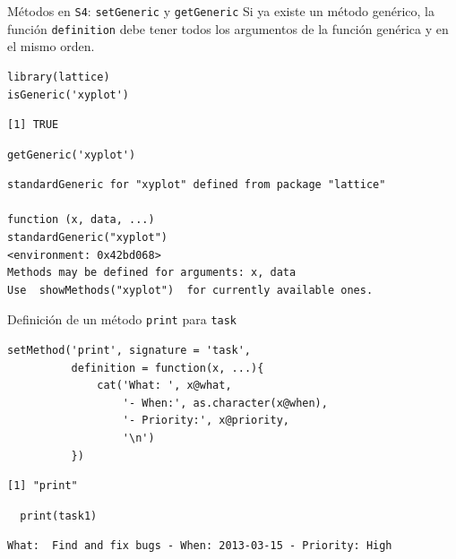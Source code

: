 \documentclass[xcolor={usenames,svgnames,dvipsnames}]{beamer}
\begin{document}
\begin{frame}[fragile,label={sec:orgheadline33}]{Métodos en \texttt{S4}: \texttt{setGeneric} y \texttt{getGeneric}}
 Si ya existe un método genérico, la función \texttt{definition} debe tener
todos los argumentos de la función genérica y en el mismo orden.

\lstset{language=R,label= ,caption= ,captionpos=b,numbers=none}
\begin{lstlisting}
library(lattice)  
isGeneric('xyplot')
\end{lstlisting}

\begin{verbatim}
[1] TRUE
\end{verbatim}

\lstset{language=R,label= ,caption= ,captionpos=b,numbers=none}
\begin{lstlisting}
getGeneric('xyplot')
\end{lstlisting}

\begin{verbatim}
standardGeneric for "xyplot" defined from package "lattice"

function (x, data, ...) 
standardGeneric("xyplot")
<environment: 0x42bd068>
Methods may be defined for arguments: x, data
Use  showMethods("xyplot")  for currently available ones.
\end{verbatim}
\end{frame}

\begin{frame}[fragile,label={sec:orgheadline34}]{Definición de un método \texttt{print} para \texttt{task}}
 \lstset{language=R,label= ,caption= ,captionpos=b,numbers=none}
\begin{lstlisting}
setMethod('print', signature = 'task',
          definition = function(x, ...){
              cat('What: ', x@what,
                  '- When:', as.character(x@when),
                  '- Priority:', x@priority,
                  '\n')
          })
\end{lstlisting}

\begin{verbatim}
[1] "print"
\end{verbatim}


\lstset{language=R,label= ,caption= ,captionpos=b,numbers=none}
\begin{lstlisting}
  print(task1)
\end{lstlisting}

\begin{verbatim}
What:  Find and fix bugs - When: 2013-03-15 - Priority: High
\end{verbatim}
\end{frame}
\end{document}

